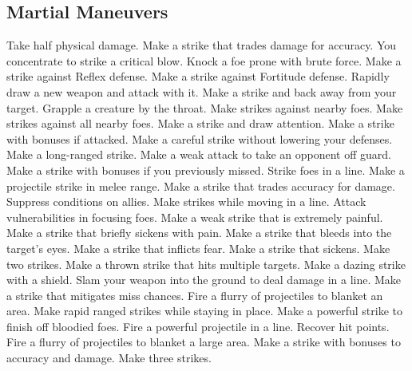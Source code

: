 \small
\subsection{Martial Maneuvers}\label{Martial Maneuvers}
\begin{spelllist}
 Take half physical damage.
 Make a strike that trades damage for accuracy.
 You concentrate to strike a critical blow.
 Knock a foe prone with brute force.
 Make a strike against Reflex defense.
 Make a strike against Fortitude defense.
 Rapidly draw a new weapon and attack with it.
 Make a strike and back away from your target.
 Grapple a creature by the throat.
 Make strikes against nearby foes.
 Make strikes against all nearby foes.
 Make a strike and draw attention.
 Make a strike with bonuses if attacked.
 Make a careful strike without lowering your defenses.
 Make a long-ranged strike.
 Make a weak attack to take an opponent off guard.
 Make a strike with bonuses if you previously missed.
 Strike foes in a line.
 Make a projectile strike in melee range.
 Make a strike that trades accuracy for damage.
 Suppress conditions on allies.
 Make strikes while moving in a line.
 Attack vulnerabilities in focusing foes.
 Make a weak strike that is extremely painful.
 Make a strike that briefly sickens with pain.
 Make a strike that bleeds into the target's eyes.
 Make a strike that inflicts fear.
 Make a strike that sickens.
 Make two strikes.
 Make a thrown strike that hits multiple targets.
 Make a dazing strike with a shield.
 Slam your weapon into the ground to deal damage in a line.
 Make a strike that mitigates miss chances.
 Fire a flurry of projectiles to blanket an area.
 Make rapid ranged strikes while staying in place.
 Make a powerful strike to finish off bloodied foes.
 Fire a powerful projectile in a line.
 Recover hit points.
 Fire a flurry of projectiles to blanket a large area.
 Make a strike with bonuses to accuracy and damage.
 Make three strikes.
\end{spelllist}



